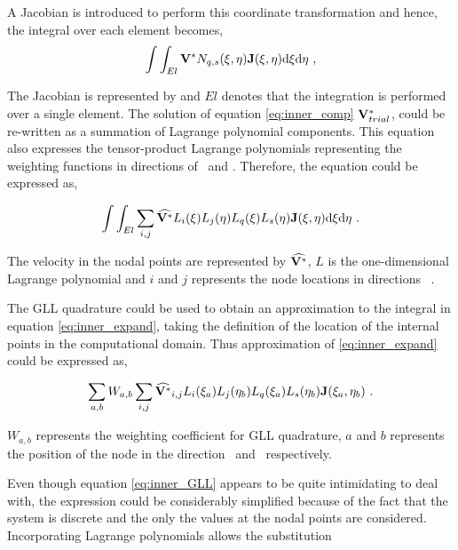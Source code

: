 A Jacobian is introduced to perform this coordinate transformation and hence, the integral over each element becomes,
\begin{equation} \centering
\label{eq:inner_comp}
\int\int_{El}\Vint N_{q,s}(\compone,\comptwo)\jacobian(\compone, \comptwo)\mathrm{d}\compone \mathrm{d}\comptwo ~,
\end{equation}

The Jacobian is represented by \jacobian and $El$ denotes that the integration is performed over a single element. The solution of equation \ref{eq:inner_comp} $\mathbf{V}_{trial}^{*}$, could be re-written as a summation of Lagrange polynomial components. This equation also expresses the tensor-product Lagrange polynomials representing the weighting functions in directions of \compone\ and \comptwo. Therefore, the equation could be expressed as,    

 \begin{equation} \centering
 \label{eq:inner_expand}
 \int\int_{El}\sum_{i,j}\widehat{\Vint}L_{i}(\compone)L_{j}(\comptwo)L_{q}(\compone)L_{s}(\comptwo)\jacobian(\compone, \comptwo)\mathrm{d}\compone \mathrm{d}\comptwo ~.
 \end{equation}
 
 The velocity in the nodal points are represented by $\widehat{\mathbf{V}^{*}}$, $L$ is the one-dimensional Lagrange polynomial and $i$ and $j$ represents the node locations in directions \compone\ \comptwo. 

The GLL quadrature could be used to obtain an approximation to the integral in equation \ref{eq:inner_expand}, taking the definition of the location of the internal points in the computational domain. Thus approximation of \ref{eq:inner_expand} could be expressed as,

\begin{equation} \centering
\label{eq:inner_GLL}
\sum_{a,b}W_{a,b}\sum_{i,j}\widehat{\Vint}_{i,j}L_{i}(\compone_{a})L_{j}(\comptwo_{b})L_{q}(\compone_{a})L_{s}(\comptwo_{b})\jacobian(\compone_{a}, \comptwo_{b}) ~.
\end{equation}

$W_{a,b}$ represents the weighting coefficient for GLL quadrature, $a$ and $b$ represents the position of the node in the direction \compone\ and \comptwo\ respectively. 


Even though equation \ref{eq:inner_GLL} appears to be quite intimidating to deal with, the expression could be considerably simplified because of the fact that the system is discrete and the only the values at the nodal points are considered. Incorporating Lagrange polynomials allows the substitution 

